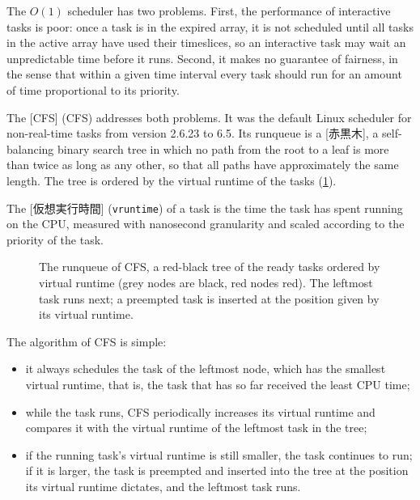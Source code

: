 \documentclass[../main.tex]{subfiles}
\begin{document}
The $O(1)$ scheduler has two problems.  First, the performance of interactive tasks is poor: once a
task is in the expired array, it is not scheduled until all tasks in the
active array have used their timeslices, so an interactive task may wait an
unpredictable time before it runs.  Second, it makes no guarantee of
fairness, in the sense that within a given time interval every task should
run for an amount of time proportional to its priority.

The [CFS]%
 (CFS) addresses both problems.
It was the default Linux scheduler for non-real-time tasks from version
2.6.23 to 6.5.  Its runqueue is a [赤黒木], a
self-balancing binary search tree in which no path from the root to a leaf is more than
twice as long as any other, so that all paths have approximately the same
length.  The tree is ordered by the virtual runtime of the tasks
(\cref{fig:l07-cfs}).

\begin{definition}
  The [仮想実行時間] (\texttt{vruntime}) of a task is
  the time the task has spent running on the CPU, measured with nanosecond
  granularity and scaled according to the priority of the task.
\end{definition}

\begin{figure}[htbp]
  \centering
  
  \caption{The runqueue of CFS, a red-black tree of the ready tasks ordered
    by virtual runtime (grey nodes are black, red nodes red).  The leftmost
    task runs next; a preempted task is inserted at the position given by
    its virtual runtime.}
  \label{fig:l07-cfs}
\end{figure}

The algorithm of CFS is simple:
\begin{itemize}
  \item it always schedules the task of the leftmost node, which has the
    smallest virtual runtime, that is, the task that has so far received
    the least CPU time;
  \item while the task runs, CFS periodically increases its virtual runtime
    and compares it with the virtual runtime of the leftmost task in the
    tree;
  \item if the running task's virtual runtime is still smaller, the task
    continues to run; if it is larger, the task is preempted and inserted
    into the tree at the position its virtual runtime dictates, and the
    leftmost task runs.
\end{itemize}
\end{document}
